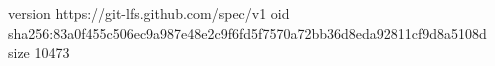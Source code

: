 version https://git-lfs.github.com/spec/v1
oid sha256:83a0f455c506ec9a987e48e2c9f6fd5f7570a72bb36d8eda92811cf9d8a5108d
size 10473
